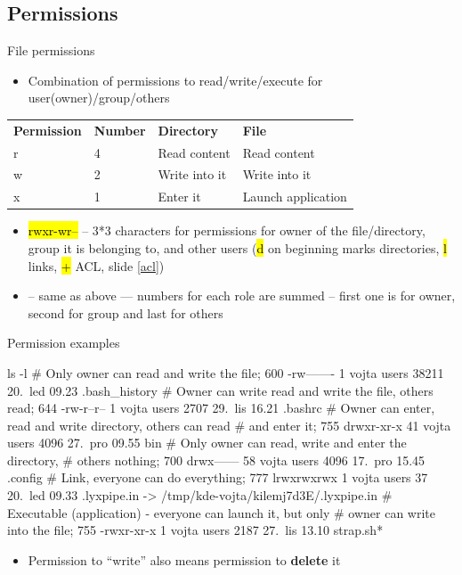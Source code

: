 \documentclass[compress, ucs, xelatex, 11pt, xcolor=svgnames,
  hyperref={
    bookmarks=true,
    unicode=true,
    colorlinks=true,
    pdftitle={Linux, command line and MetaCentrum},
    plainpages=false,
    pdfauthor={Vojtech Zeisek},
    pdfsubject={Course about use of Linux command line, writing shell scripts and using MetaCentrum of CESNET},
    pdfcreator={XeLaTeX},
    pdfkeywords={Linux, GNU, BASH, shell, command line, MetaCentrum},
    linkcolor=DarkRed,
    anchorcolor=DarkBlue,
    citecolor=Indigo,
    filecolor=NavyBlue,
    menucolor=DarkMagenta,
    urlcolor=DarkBlue,
    pdftex},
  url={hyphens, lowtilde} %
  ]{beamer}
\renewcommand{\texttt}[1]{\hl{\ttfamily #1}}
\begin{document}
\subsection{Permissions}

\begin{frame}{File permissions}
\begin{itemize}
  \item Combination of permissions to read/write/execute for user(owner)/group/others
\end{itemize}
\begin{center}
\begin{tabular}{llll}
\textbf{Permission} & \textbf{Number} & \textbf{Directory} & \textbf{File}\\
r & 4 & Read content & Read content\\
w & 2 & Write into it & Write into it\\
x & 1 & Enter it & Launch application \\
\end{tabular}
\end{center}
\begin{itemize}
  \item \texttt{rwxr-wr--} -- 3*3 characters for permissions for owner of the file/directory, group it is belonging to, and other users (\texttt{d} on beginning marks directories, \texttt{l} links, \texttt{+} ACL, slide \ref{acl})
  \item \texttt{764} -- same as above --- numbers for each role are summed -- first one is for owner, second for group and last for others
\end{itemize}
\end{frame}

\begin{frame}[fragile]{Permission examples}
  \begin{bashcode}
    ls -l
    # Only owner can read and write the file; 600
    -rw-------   1 vojta users   38211 20. led 09.23 .bash_history
    # Owner can write read and write the file, others read; 644
    -rw-r--r--   1 vojta users    2707 29. lis 16.21 .bashrc
    # Owner can enter, read and write directory, others can read
    # and enter it; 755
    drwxr-xr-x  41 vojta users    4096 27. pro 09.55 bin
    # Only owner can read, write and enter the directory,
    # others nothing; 700
    drwx------  58 vojta users    4096 17. pro 15.45 .config
    # Link, everyone can do everything; 777
    lrwxrwxrwx   1 vojta users      37 20. led 09.33 .lyxpipe.in ->
      /tmp/kde-vojta/kilemj7d3E/.lyxpipe.in
    # Executable (application) - everyone can launch it, but only
    # owner can write into the file; 755
    -rwxr-xr-x   1 vojta users    2187 27. lis 13.10 strap.sh*
  \end{bashcode}
  \vfil
  \begin{itemize}
    \item Permission to ``write'' also means permission to \textbf{delete} it
  \end{itemize}
\end{frame}
\end{document}
